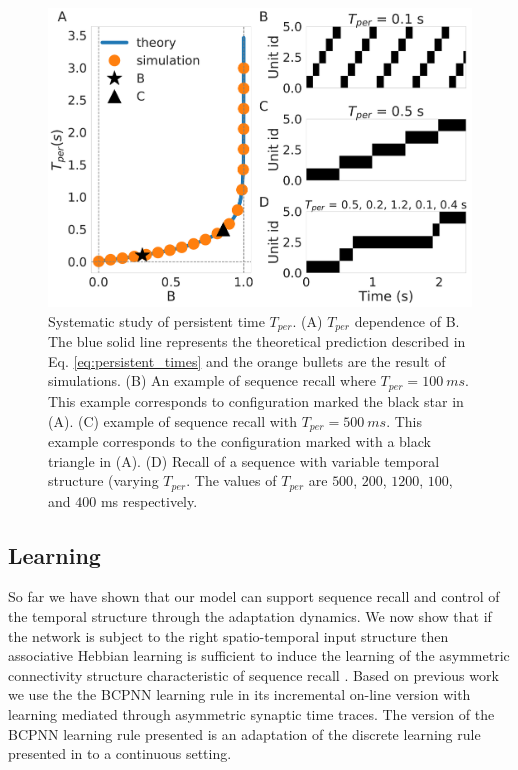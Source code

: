 \documentclass[10pt,a4paper]{article}
\begin{document}
\begin{figure}[H]
\centering
\includegraphics[scale=0.30]{persistent_times.pdf}
\caption{Systematic study of persistent time $T_{per}$. (A) $T_{per}$ dependence of B. The blue solid line represents the theoretical prediction described in Eq. \ref{eq:persistent_times} and the orange bullets are the result of simulations. (B) An example of sequence recall where $T_{per}=100 \: ms$. This example corresponds to configuration marked the black star in (A). (C) example of sequence recall with $T_{per}=500 \: ms$. This example corresponds to the configuration marked with a black triangle in (A). (D) Recall of a sequence with variable temporal structure (varying $T_{per}$. The values of $T_{per}$ are $500$, $200$, $1200$, $100$, and $400 $ ms respectively.}
\label{fig:per_time}
\end{figure}

\subsection{Learning}

So far we have shown that our model can support sequence recall and control of the temporal structure through the adaptation dynamics. We now show that if the network is subject to the right spatio-temporal input structure then associative Hebbian learning is sufficient to induce the learning of the asymmetric connectivity structure characteristic of sequence recall \cite{amit1992modeling}. Based on previous work \cite{tully2016spike} we use the the BCPNN learning rule  in its incremental on-line version \cite{sandberg2002bayesian} with learning mediated through asymmetric synaptic time traces. The version of the BCPNN learning rule presented is an adaptation of the discrete learning rule presented in \cite{lansner1989one} to a continuous setting. 
\end{document}

